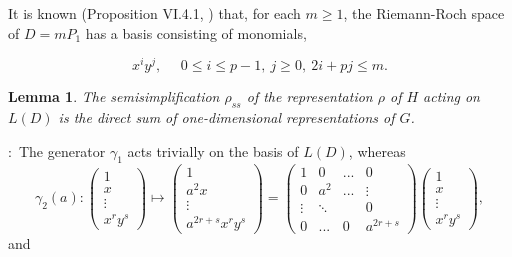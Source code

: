 \documentclass[12pt]{article}
\newtheorem{lemma}[theorem]{Lemma}
\numberwithin{equation}{section}
\def\pf{\noindent {\bf Proof}:\ }
\begin{document}
It is known (Proposition VI.4.1, \cite{Sti}) that, 
for each $m\geq 1$, the Riemann-Roch space
of $D=mP_1$ has a basis consisting of monomials,

\[
x^iy^j,\ \ \ \ \ \ 
0\leq i\leq p-1,\ j\geq 0,\ 2i+pj\leq m.
\]

\begin{lemma}
The semisimplification $\rho_{ss}$ of 
the representation $\rho$ of $H$ acting on $L(D)$ 
is the direct sum of 
one-dimensional representations of $G$.
\end{lemma}

\pf The generator $\gamma_1$ acts trivially on the 
basis of $L(D)$, whereas
\[
\gamma_2(a):
\left(
\begin{array}{c}
1\\
x\\
\vdots \\
x^ry^s
\end{array}
\right)
\longmapsto 
\left(
\begin{array}{c}
1\\
a^2x\\
\vdots \\
a^{2r+s}x^ry^s
\end{array}
\right)
=
\left(
\begin{array}{cccc}
1 & 0 & ...& 0\\
0 & a^2 & ...& \vdots\\
\vdots &\ddots  & &0 \\
0 & ... & 0 & a^{2r+s}
\end{array}
\right)
\left(
\begin{array}{c}
1\\
x\\
\vdots \\
x^ry^s
\end{array}
\right),
\]
and
\end{document}
